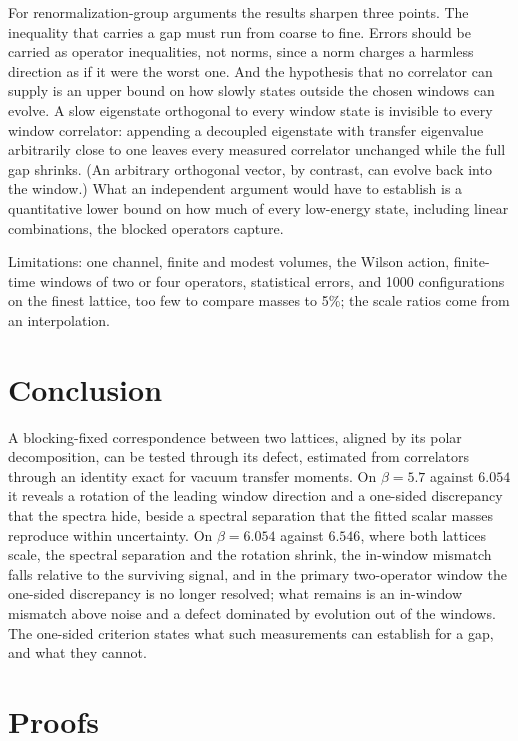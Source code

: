 \documentclass[11pt]{article}
\begin{document}
For renormalization-group arguments the results sharpen three points. The inequality that carries a gap
must run from coarse to fine. Errors should be carried as operator inequalities, not norms, since a norm
charges a harmless direction as if it were the worst one. And the hypothesis that no correlator can
supply is an upper bound on how slowly states outside the chosen windows can evolve. A slow eigenstate
orthogonal to every window state is invisible to every window correlator: appending a decoupled
eigenstate with transfer eigenvalue arbitrarily close to one leaves every measured correlator unchanged
while the full gap shrinks. (An arbitrary orthogonal vector, by contrast, can evolve back into the
window.) What an independent argument would have to establish is a quantitative lower bound on how much
of every low-energy state, including linear combinations, the blocked operators capture.

Limitations: one channel, finite and modest volumes, the Wilson action, finite-time windows of two or
four operators, statistical errors, and 1000 configurations on the finest lattice, too few to compare
masses to 5\%; the scale ratios come from an interpolation.

\section{Conclusion}

A blocking-fixed correspondence between two lattices, aligned by its polar decomposition, can be tested
through its defect, estimated from correlators through an identity exact for vacuum transfer moments. On
$\beta=5.7$ against $6.054$ it reveals a rotation of the leading window direction and a one-sided
discrepancy that the spectra hide, beside a spectral separation that the fitted scalar masses reproduce
within uncertainty. On $\beta=6.054$ against $6.546$, where both lattices scale, the spectral separation
and the rotation shrink, the in-window mismatch falls relative to the surviving signal, and in the
primary two-operator window the one-sided discrepancy is no longer resolved; what remains is an in-window
mismatch above noise and a defect dominated by evolution out of the windows. The one-sided criterion
states what such measurements can establish for a gap, and what they cannot.

\appendix

\section{Proofs}\label{app:proofs}
\end{document}
